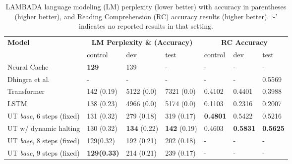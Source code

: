 \begin{table}
\centering
    \begin{adjustbox}{max width=\textwidth}
    \begin{tabular}{lllllll}
    \toprule
    \multirow{2}{*}{ \bf Model } & \multicolumn{3}{c}{\bf LM Perplexity \& (Accuracy) } & \multicolumn{3}{c}{\bf RC Accuracy } \\ \cmidrule(l{2pt}r{2pt}){2-4} \cmidrule(l{2pt}r{2pt}){5-7}
    & control & dev & test & control & dev & test \\ \midrule
    Neural Cache~\citep{grave2016improving} & {\bf 129} & 139 & - & - & - & - \\ 
    Dhingra et al.~\cite{dhingra2018neural} & - & - & - & - & - & 0.5569 \\ \midrule
    Transformer & 142 (0.19) & 5122 (0.0) & 7321 (0.0) & 
    0.4102 & 0.4401 & 0.3988 \\
    LSTM & 138 (0.23) & 4966 (0.0) & 5174 (0.0) & 0.1103 & 0.2316 & 0.2007 \\
    UT \emph{base}, 6 steps (fixed) & 131 (0.32) & 279 (0.18) & 319 (0.17) & {\bf 0.4801} & 0.5422 & 0.5216 \\
    UT w/ dynamic halting & 130 (0.32) & {\bf 134} (0.22) & {\bf 142} (0.19) & 0.4603 & {\bf 0.5831} & {\bf 0.5625} \\ \midrule
    UT \emph{base}, 8 steps (fixed) & 129(0.32) & 192 (0.21) & 202 (0.18) & - & - & - \\
    UT \emph{base}, 9 steps (fixed) & \textbf{129(0.33)} & 214 (0.21) & 239 (0.17) & - & - & - \\
 \bottomrule
    \end{tabular}
    \end{adjustbox}
    \caption{LAMBADA language modeling (LM) perplexity (lower better) with accuracy in parentheses (higher better), and Reading Comprehension (RC) accuracy results (higher better). `-' indicates no reported results in that setting.}
    \label{tab:lambada}
\end{table}